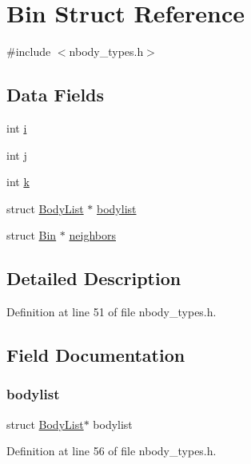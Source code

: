 \hypertarget{struct_bin}{}\section{Bin Struct Reference}
\label{struct_bin}


{\ttfamily \#include $<$nbody\+\_\+types.\+h$>$}

\subsection*{Data Fields}
\begin{DoxyCompactItemize}
\item 
int \hyperlink{struct_bin_acb559820d9ca11295b4500f179ef6392}{i}
\item 
int \hyperlink{struct_bin_a37d972ae0b47b9099e30983131d31916}{j}
\item 
int \hyperlink{struct_bin_ab66ed8e0098c0a86b458672a55a9cca9}{k}
\item 
struct \hyperlink{struct_body_list}{Body\+List} $\ast$ \hyperlink{struct_bin_aaa79dba755c4edd20afd94e5c11c1c96}{bodylist}
\item 
struct \hyperlink{struct_bin}{Bin} $\ast$ \hyperlink{struct_bin_a4c64e88a16c43b567dfe1c1695ee10fb}{neighbors}
\end{DoxyCompactItemize}


\subsection{Detailed Description}


Definition at line 51 of file nbody\+\_\+types.\+h.



\subsection{Field Documentation}
\hypertarget{struct_bin_aaa79dba755c4edd20afd94e5c11c1c96}{}\label{struct_bin_aaa79dba755c4edd20afd94e5c11c1c96} 
\subsubsection{\texorpdfstring{bodylist}{bodylist}}
{\footnotesize\ttfamily struct \hyperlink{struct_body_list}{Body\+List}$\ast$ bodylist}



Definition at line 56 of file nbody\+\_\+types.\+h.

